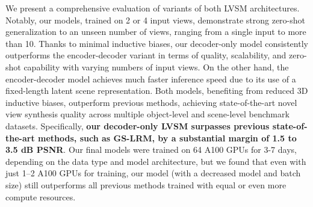 We present a comprehensive evaluation of variants of both LVSM architectures. 
Notably, our models, trained on 2 or 4 input views, demonstrate strong zero-shot generalization to an unseen number of views, ranging from a single input to more than 10. Thanks to minimal inductive biases, our decoder-only model consistently outperforms the encoder-decoder variant in terms of quality, scalability, and zero-shot capability with varying numbers of input views. 
On the other hand, the encoder-decoder model achieves much faster inference speed due to its use of a fixed-length latent scene representation. Both models, benefiting from reduced 3D inductive biases, outperform previous methods, achieving state-of-the-art novel view synthesis quality across multiple object-level and scene-level benchmark datasets. Specifically, \textbf{our decoder-only LVSM surpasses previous state-of-the-art methods, such as GS-LRM, by a substantial margin of 1.5 to 3.5 dB PSNR}.  Our final models were trained on 64 A100 GPUs for 3-7 days, depending on the data type and model architecture, but we found that even with just 1--2 A100 GPUs for training, our model (with a decreased model and batch size) still outperforms all previous methods trained with equal or even more compute resources.


